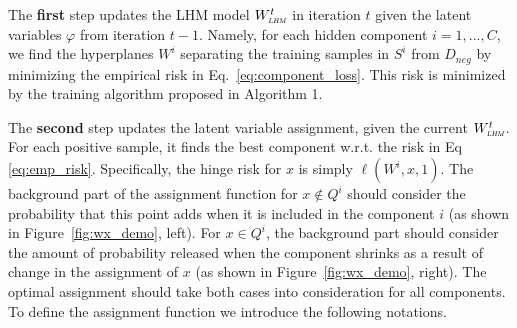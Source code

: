 \documentclass[twoside,11pt]{article}
\newcommand{\wl}{W_{\textsc{\textsc{\relsize{-2}{\textsl{LHM}}}}}}
\begin{document}
The \textbf{first} step updates the LHM model $\wl^t$  in iteration $t$ given the latent variables $\varphi$ from iteration $t-1$. Namely, for each hidden component $i=1,...,C$, we find the hyperplanes $W^i$ separating the training samples in $S^i$ from $D_{neg}$ by minimizing the empirical risk in Eq.~\ref{eq:component_loss}. This risk is minimized by the training algorithm proposed in Algorithm 1.

The \textbf{second} step updates the latent variable assignment, given the current $\wl^t$. For each positive sample, it finds the best component w.r.t. the risk in Eq~ \ref{eq:emp_risk}. Specifically, the hinge risk for $x$ is simply $\ell(W^i,x,1)$. The background part of the assignment function for $x\notin Q^i$ should consider the probability that this point adds when it is included in the component $i$ (as shown in Figure~\ref{fig:wx_demo}, left). For $x\in Q^i$, the background part should consider the amount of probability released when the component shrinks as a result of change in the assignment of $x$ (as shown in Figure~\ref{fig:wx_demo}, right). The optimal assignment should take both cases into consideration for all components. To define the assignment function we introduce the following notations.
\end{document}
